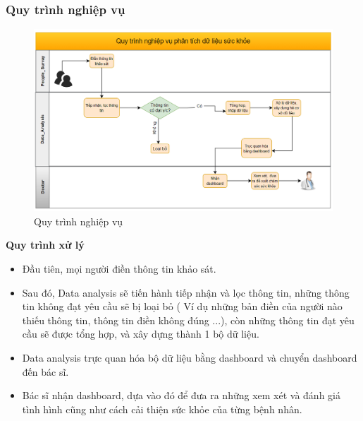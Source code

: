 \subsubsection{Quy trình nghiệp vụ}
\begin{center}
            \begin{figure}[!h]
                \centering
                \includegraphics[scale = 0.6]{figures/Duyen/Phân tích nghiệp vụ.PNG}
              \caption{Quy trình nghiệp vụ}
            \end{figure}
\end{center}
\textbf{Quy trình xử lý}
\begin{itemize}[label=$-$]
    \item Đầu tiên, mọi người điền thông tin khảo sát.
    \item Sau đó, Data analysis sẽ tiến hành tiếp nhận và lọc thông tin, những thông tin không đạt yêu cầu sẽ bị loại bỏ ( Ví dụ những bản điền của người nào thiếu thông tin, thông tin điền không đúng ...), còn những thông tin đạt yêu cầu sẽ được tổng hợp, và xây dựng thành 1 bộ dữ liệu.
    \item Data analysis trực quan hóa bộ dữ liệu bằng dashboard và chuyển dashboard đến bác sĩ.
    \item Bác sĩ nhận dashboard, dựa vào đó để đưa ra những xem xét và đánh giá tình hình cũng như cách cải thiện sức khỏe của từng bệnh nhân.
\end{itemize}
